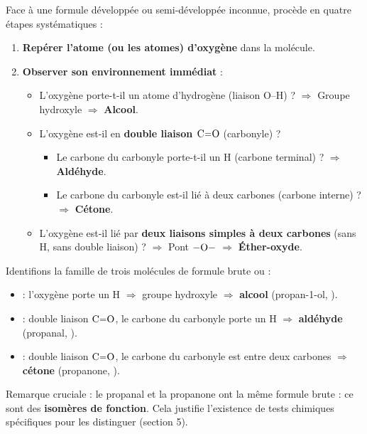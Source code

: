 \documentclass[11pt]{article}
\begin{document}
\begin{methode}
Face à une formule développée ou semi-développée inconnue, procède en quatre étapes systématiques :
\begin{enumerate}
\item \textbf{Repérer l'atome (ou les atomes) d'oxygène} dans la molécule.
\item \textbf{Observer son environnement immédiat} :
      \begin{itemize}
      \item L'oxygène porte-t-il un atome d'hydrogène (liaison O--H) ? $\Rightarrow$ Groupe hydroxyle $\Rightarrow$ \textbf{Alcool}.
      \item L'oxygène est-il en \textbf{double liaison $\ce{C=O}$} (carbonyle) ?
            \begin{itemize}
            \item Le carbone du carbonyle porte-t-il un H (carbone terminal) ? $\Rightarrow$ \textbf{Aldéhyde}.
            \item Le carbone du carbonyle est-il lié à deux carbones (carbone interne) ? $\Rightarrow$ \textbf{Cétone}.
            \end{itemize}
      \item L'oxygène est-il lié par \textbf{deux liaisons simples à deux carbones} (sans H, sans double liaison) ? $\Rightarrow$ Pont $-\ce{O}-$ $\Rightarrow$ \textbf{Éther-oxyde}.
      \end{itemize}
\end{enumerate}
\end{methode}

\begin{exemplebox}
Identifions la famille de trois molécules de formule brute  ou  :
\begin{itemize}
\item {} : l'oxygène porte un H $\Rightarrow$ groupe hydroxyle $\Rightarrow$ \textbf{alcool} (propan-1-ol, ).
\item {} : double liaison $\ce{C=O}$, le carbone du carbonyle porte un H $\Rightarrow$ \textbf{aldéhyde} (propanal, ).
\item {} : double liaison $\ce{C=O}$, le carbone du carbonyle est entre deux carbones $\Rightarrow$ \textbf{cétone} (propanone, ).
\end{itemize}
Remarque cruciale : le propanal et la propanone ont la même formule brute  : ce sont des \textbf{isomères de fonction}. Cela justifie l'existence de tests chimiques spécifiques pour les distinguer (section 5).
\end{exemplebox}
\end{document}
